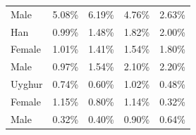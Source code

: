 \begin{table}
\begin{center}
\begin{tabular}{l rrrr}
            \quad Male   & 5.08\%  & 6.19\%  & 4.76\%  & 2.63\%  \\
            Han          & 0.99\%  & 1.48\%  & 1.82\%  & 2.00\%  \\
            \quad Female & 1.01\%  & 1.41\%  & 1.54\%  & 1.80\%  \\
            \quad Male   & 0.97\%  & 1.54\%  & 2.10\%  & 2.20\%  \\
            Uyghur       & 0.74\%  & 0.60\%  & 1.02\%  & 0.48\%  \\
            \quad Female & 1.15\%  & 0.80\%  & 1.14\%  & 0.32\%  \\
            \quad Male   & 0.32\%  & 0.40\%  & 0.90\%  & 0.64\%  \\
            \hline
        \end{tabular}
    \end{center}
\end{table}
